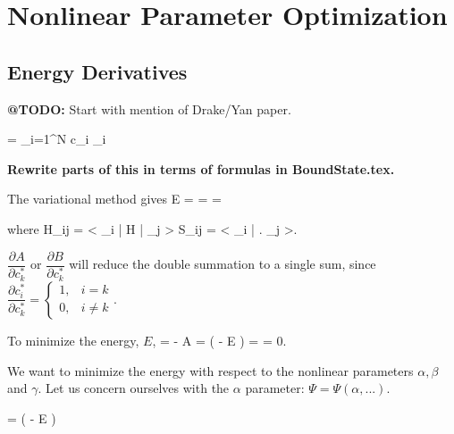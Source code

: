 \documentclass[Dissertation.tex]{subfiles}
\begin{document}
\newpage
\chapter{Nonlinear Parameter Optimization}

\section{Energy Derivatives}

\label{chp:EnergyDer}
\textbf{@TODO:} Start with mention of Drake/Yan paper.

\beq
\Psi = \sum_{i=1}^N c_i \psi_i
\eeq

\textbf{Rewrite parts of this in terms of formulas in BoundState.tex.}

The variational method gives
\beq
E = 
  = 
  =  \equiv {}
\eeq

where
\beq
H_{ij} = \left< \psi_i \left| H \right| \psi_j \right>
S_{ij} = \left< \psi_i \left| \right.\! \psi_j \right>.
\eeq

$\dfrac{\partial A}{\partial c_k^*}$ or $\dfrac{\partial B}{\partial c_k^*}$ will reduce the double summation to a single sum, since 
$ \dfrac{\partial c_i^*}{\partial c_k^*} =
\begin{cases}
1,& i = k \\
0,& i \neq k
\end{cases}.$

To minimize the energy, $E$,
\beq
{} =   -   A
=  \left( - E \right)
=  = 0.
\eeq

We want to minimize the energy with respect to the nonlinear parameters $\alpha, \beta$ and $\gamma$.  Let us concern ourselves with the $\alpha$ parameter:  $\Psi = \Psi(\alpha, ...)$.

\beq
{} =  \left( - E  \right)
\label{eq:EnergyDerE1}
\eeq
\end{document}
